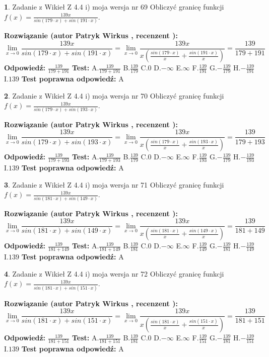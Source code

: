 \documentclass[12pt, a4paper]{article}
\theoremstyle{definition} %
\newtheorem{zad}{}
\newcommand{\zadStart}[1]{\begin{zad}#1\newline}
\newcommand{\zadStop}{\end{zad}}
\newcommand{\rozwStart}[2]{\noindent \textbf{Rozwiązanie (autor #1 , recenzent #2): }\newline}
\newcommand{\rozwStop}{\newline}
\newcommand{\odpStart}{\noindent \textbf{Odpowiedź:}\newline}
\newcommand{\odpStop}{\newline}
\newcommand{\testStart}{\noindent \textbf{Test:}\newline}
\newcommand{\testStop}{\newline}
\newcommand{\kluczStart}{\noindent \textbf{Test poprawna odpowiedź:}\newline}
\newcommand{\kluczStop}{\newline}
\begin{document}
\zadStart{Zadanie z Wikieł Z 4.4 i) moja wersja nr 69}
Obliczyć granicę funkcji $f(x)=\frac{139x}{sin(179\cdot x) +sin(191\cdot x)}$.
\zadStop
\rozwStart{Patryk Wirkus}{}
$$\lim\limits_{x\to 0}\frac{139x}{sin(179\cdot x) +sin(191\cdot x)}=\lim\limits_{x\to 0}\frac{139x}{x(\frac{sin(179\cdot x)}{x}+\frac{sin(191\cdot x)}{x})}=\frac{139}{179+191}$$
\rozwStop
\odpStart
$\frac{139}{179+191}$
\odpStop
\testStart
A.$\frac{139}{179+191}$
B.$\frac{139}{179}$
C.$0$
D.$-\infty$
E.$\infty$
F.$\frac{139}{191}$
G.$-\frac{139}{179}$
H.$-\frac{139}{191}$
I.$139$
\testStop
\kluczStart
A
\kluczStop



\zadStart{Zadanie z Wikieł Z 4.4 i) moja wersja nr 70}
Obliczyć granicę funkcji $f(x)=\frac{139x}{sin(179\cdot x) +sin(193\cdot x)}$.
\zadStop
\rozwStart{Patryk Wirkus}{}
$$\lim\limits_{x\to 0}\frac{139x}{sin(179\cdot x) +sin(193\cdot x)}=\lim\limits_{x\to 0}\frac{139x}{x(\frac{sin(179\cdot x)}{x}+\frac{sin(193\cdot x)}{x})}=\frac{139}{179+193}$$
\rozwStop
\odpStart
$\frac{139}{179+193}$
\odpStop
\testStart
A.$\frac{139}{179+193}$
B.$\frac{139}{179}$
C.$0$
D.$-\infty$
E.$\infty$
F.$\frac{139}{193}$
G.$-\frac{139}{179}$
H.$-\frac{139}{193}$
I.$139$
\testStop
\kluczStart
A
\kluczStop



\zadStart{Zadanie z Wikieł Z 4.4 i) moja wersja nr 71}
Obliczyć granicę funkcji $f(x)=\frac{139x}{sin(181\cdot x) +sin(149\cdot x)}$.
\zadStop
\rozwStart{Patryk Wirkus}{}
$$\lim\limits_{x\to 0}\frac{139x}{sin(181\cdot x) +sin(149\cdot x)}=\lim\limits_{x\to 0}\frac{139x}{x(\frac{sin(181\cdot x)}{x}+\frac{sin(149\cdot x)}{x})}=\frac{139}{181+149}$$
\rozwStop
\odpStart
$\frac{139}{181+149}$
\odpStop
\testStart
A.$\frac{139}{181+149}$
B.$\frac{139}{181}$
C.$0$
D.$-\infty$
E.$\infty$
F.$\frac{139}{149}$
G.$-\frac{139}{181}$
H.$-\frac{139}{149}$
I.$139$
\testStop
\kluczStart
A
\kluczStop



\zadStart{Zadanie z Wikieł Z 4.4 i) moja wersja nr 72}
Obliczyć granicę funkcji $f(x)=\frac{139x}{sin(181\cdot x) +sin(151\cdot x)}$.
\zadStop
\rozwStart{Patryk Wirkus}{}
$$\lim\limits_{x\to 0}\frac{139x}{sin(181\cdot x) +sin(151\cdot x)}=\lim\limits_{x\to 0}\frac{139x}{x(\frac{sin(181\cdot x)}{x}+\frac{sin(151\cdot x)}{x})}=\frac{139}{181+151}$$
\rozwStop
\odpStart
$\frac{139}{181+151}$
\odpStop
\testStart
A.$\frac{139}{181+151}$
B.$\frac{139}{181}$
C.$0$
D.$-\infty$
E.$\infty$
F.$\frac{139}{151}$
G.$-\frac{139}{181}$
H.$-\frac{139}{151}$
I.$139$
\testStop
\kluczStart
A
\kluczStop
\end{document}

